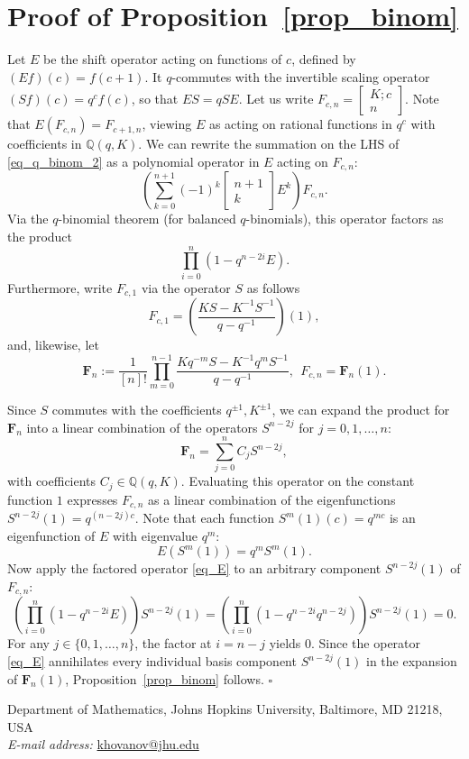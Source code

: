 \documentclass{article}
\def\Q{\mathbb Q}
\newcommand{\bbinom}[2]{
  \begin{bmatrix}
    #1 \\
    #2
  \end{bmatrix}
}
\newcommand{\bmat}[3]{
  \begin{bmatrix}
    #1 ; #2 \\
    #3
  \end{bmatrix}
}
\theoremstyle{definition}
\theoremstyle{definition}
\begin{document}
%
%

\section{Proof of Proposition~\ref{prop_binom}}
\label{subsec_prop_binom}

 Let $E$ be the shift operator acting on functions of $c$, defined by $(E f)(c) = f(c+1)$. It $q$-commutes with the invertible scaling operator $(Sf)(c)=q^c f(c)$, so that $ES=qSE$. Let us write $F_{c,n}=\bmat{K}{c}{n}$. Note that $E (F_{c,n})=F_{c+1,n}$, viewing $E$ as acting on rational functions in $q^c$ with coefficients in $\Q(q,K)$.  We can rewrite the summation on the LHS of \eqref{eq_q_binom_2} as a polynomial operator in $E$ acting on $F_{c,n}$:
 $$\left( \sum_{k=0}^{n+1} (-1)^k \bbinom{n+1}{k} E^k \right) F_{c,n}.$$
 Via the $q$-binomial theorem (for balanced $q$-binomials), this operator factors as the product
 \begin{equation}\label{eq_E}
  \prod_{i=0}^n (1 - q^{n-2i} E).
 \end{equation}
 Furthermore, write $F_{c,1}$ via the operator $S$ as follows
 \[
 F_{c,1}= \left( \frac{K S - K^{-1} S^{-1}}{q - q^{-1}} \right) (1),
 \]
 and, likewise, let
 \[\mathbf{F}_n := \frac{1}{[n]!} \prod_{m=0}^{n-1} \frac{K q^{-m} S - K^{-1} q^m S^{-1}}{q - q^{-1}}, \ \ F_{c,n}= \mathbf{F}_n(1).
 \]

 Since $S$ commutes with the coefficients $q^{\pm 1},K^{\pm 1}$, we can expand the product for $\mathbf{F}_n$ into a linear combination of the operators $S^{n-2j}$ for $j=0, 1, \dots, n$:$$\mathbf{F}_n = \sum_{j=0}^n C_j S^{n-2j},$$
 with coefficients $C_j \in \mathbb{Q}(q,K)$.
 Evaluating this operator on the constant function $1$ expresses $F_{c,n}$ as a linear combination of the eigenfunctions $S^{n-2j}(1) = q^{(n-2j)c}$.
 Note that each function $S^m(1)(c)=q^{mc}$ is an eigenfunction of $E$ with eigenvalue $q^m$:
 $$E(S^{m}(1)) = q^{m} S^{m}(1).$$
 Now apply the factored operator \eqref{eq_E} to an arbitrary  component $S^{n-2j}(1)$ of $F_{c,n}$:
 $$\left( \prod_{i=0}^n (1 - q^{n-2i} E) \right) S^{n-2j}(1) = \left( \prod_{i=0}^n (1 - q^{n-2i} q^{n-2j}) \right) S^{n-2j}(1)=0.$$
 For any $j \in \{0, 1, \dots, n\}$, the factor  at $i = n-j$ yields $0$.
 Since the operator \eqref{eq_E} annihilates every individual basis component $S^{n-2j}(1)$ in the expansion of $\mathbf{F}_n(1)$, Proposition~\ref{prop_binom} follows.  $\square$




\printbibliography
%
%

\vspace{2em} \noindent
Department of Mathematics, Johns Hopkins University, Baltimore, MD 21218, USA\\
\textit{E-mail address:} \href{mailto:khovanov@jhu.edu}{khovanov@jhu.edu}
\end{document}
